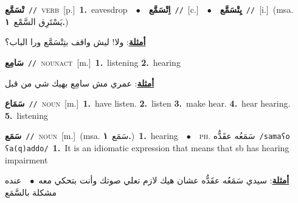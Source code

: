 \documentclass[10pt,a4paper,twoside]{article} %
\begin{document}
\begin{multicols}{2}
{\setlength\topsep{0pt}\textbf{\foreignlanguage{arabic}{تْسَمَّع}}\ {\color{gray}\texttt{//}\color{black}}\ \textsc{verb}\ [p.]\ \textbf{1.}~eavesdrop\ \ $\bullet$\ \ \setlength\topsep{0pt}\textbf{\foreignlanguage{arabic}{اِتْسَمَّع}}\ {\color{gray}\texttt{//}\color{black}}\ [c.]\ \ $\bullet$\ \ \setlength\topsep{0pt}\textbf{\foreignlanguage{arabic}{يِتْسَمَّع}}\ {\color{gray}\texttt{//}\color{black}}\ [i.]\ \color{gray}(msa. \foreignlanguage{arabic}{يَسْتَرِق السَّمْع}~\foreignlanguage{arabic}{\textbf{١.}})\color{black}\  \begin{flushright}\color{gray}\foreignlanguage{arabic}{\textbf{\underline{\foreignlanguage{arabic}{أمثلة}}}: ولا! ليش واقف بتِتْسَمَّع ورا الباب؟}\end{flushright}\color{black}} \vspace{2mm}

{\setlength\topsep{0pt}\textbf{\foreignlanguage{arabic}{سَامِع}}\ {\color{gray}\texttt{//}\color{black}}\ \textsc{noun\textunderscore act}\ [m.]\ \textbf{1.}~listening  \textbf{2.}~hearing\  \begin{flushright}\color{gray}\foreignlanguage{arabic}{\textbf{\underline{\foreignlanguage{arabic}{أمثلة}}}: عمري مش سامِع بهيك شي من قبل}\end{flushright}\color{black}} \vspace{2mm}

{\setlength\topsep{0pt}\textbf{\foreignlanguage{arabic}{سَمَاع}}\ {\color{gray}\texttt{//}\color{black}}\ \textsc{noun}\ [m.]\ \textbf{1.}~have listen.  \textbf{2.}~listen  \textbf{3.}~make hear.  \textbf{4.}~hear hearing.  \textbf{5.}~listening\ } \vspace{2mm}

{\setlength\topsep{0pt}\textbf{\foreignlanguage{arabic}{سَمَع}}\ {\color{gray}\texttt{//}\color{black}}\ \textsc{noun}\ [m.]\ \color{gray}(msa. \foreignlanguage{arabic}{سَمَع}~\foreignlanguage{arabic}{\textbf{١.}})\color{black}\ \textbf{1.}~hearing\ \ $\bullet$\ \ \textsc{ph.} \color{gray} \foreignlanguage{arabic}{سَمَعُه عقَدُّه}\color{black}\ {\color{gray}\texttt{/{\sffamily samaʕo ʕa(q)addo}/}\color{black}}\ \textbf{1.}~It is an idiomatic expression that means that sb has hearing impairment\  \begin{flushright}\color{gray}\foreignlanguage{arabic}{\textbf{\underline{\foreignlanguage{arabic}{أمثلة}}}: سيدي سَمَعُه عقَدُّه عشان هيك لازم تعلي صوتك وأنت بتحكي معه\ $\bullet$\ \  عنده مشكلة بالسَّمَع}\end{flushright}\color{black}} \vspace{2mm}


\end{multicols}
\end{document}
